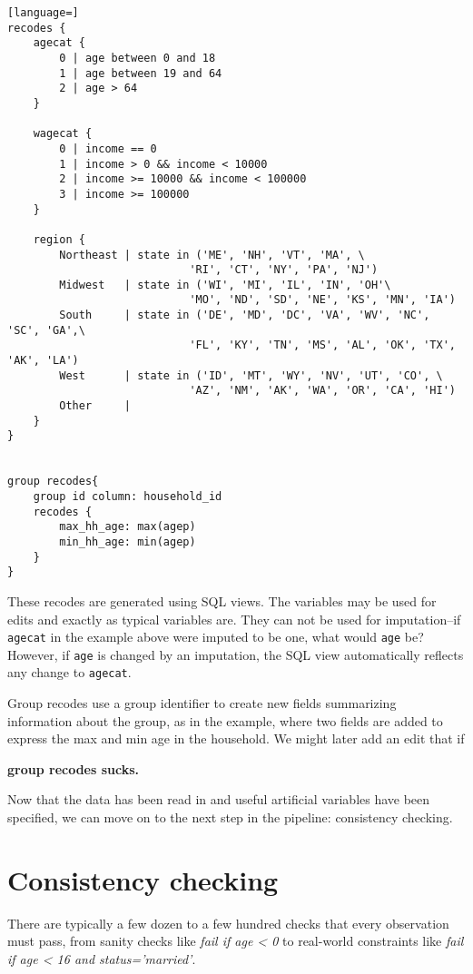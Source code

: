 \documentclass{article}
\begin{document}
\begin{lstlisting}[language=]
recodes {
    agecat {
        0 | age between 0 and 18
        1 | age between 19 and 64
        2 | age > 64
    }

    wagecat {
        0 | income == 0
        1 | income > 0 && income < 10000
        2 | income >= 10000 && income < 100000
        3 | income >= 100000
    }

    region {
        Northeast | state in ('ME', 'NH', 'VT', 'MA', \
                            'RI', 'CT', 'NY', 'PA', 'NJ')
        Midwest   | state in ('WI', 'MI', 'IL', 'IN', 'OH'\
                            'MO', 'ND', 'SD', 'NE', 'KS', 'MN', 'IA')
        South     | state in ('DE', 'MD', 'DC', 'VA', 'WV', 'NC', 'SC', 'GA',\
                            'FL', 'KY', 'TN', 'MS', 'AL', 'OK', 'TX', 'AK', 'LA')
        West      | state in ('ID', 'MT', 'WY', 'NV', 'UT', 'CO', \
                            'AZ', 'NM', 'AK', 'WA', 'OR', 'CA', 'HI')
        Other     | 
    }
}


group recodes{
    group id column: household_id
    recodes {
        max_hh_age: max(agep)
        min_hh_age: min(agep)
    }
}

\end{lstlisting}

These recodes are generated using SQL views. The variables may be used for edits and
exactly as typical variables are. They can not be used for imputation--if {\tt agecat} in the
example above were imputed to be one, what would {\tt age} be? However, if {\tt age} is changed by
an imputation, the SQL view automatically reflects any change to {\tt agecat}.

Group recodes use a group identifier to create new fields summarizing information about
the group, as in the example, where two fields are added to express the max and min
age in the household. We might later add an edit that if 

{\bf group recodes sucks.}

Now that the data has been read in and useful artificial variables have been specified,
we can move on to the next step in the pipeline: consistency checking.


\section{Consistency checking}
There are typically a few dozen to a few hundred checks that every observation must
pass, from sanity checks like {\em fail if age < 0} to real-world constraints like
{\em fail if age < 16 and status='married'}. 
\end{document}
